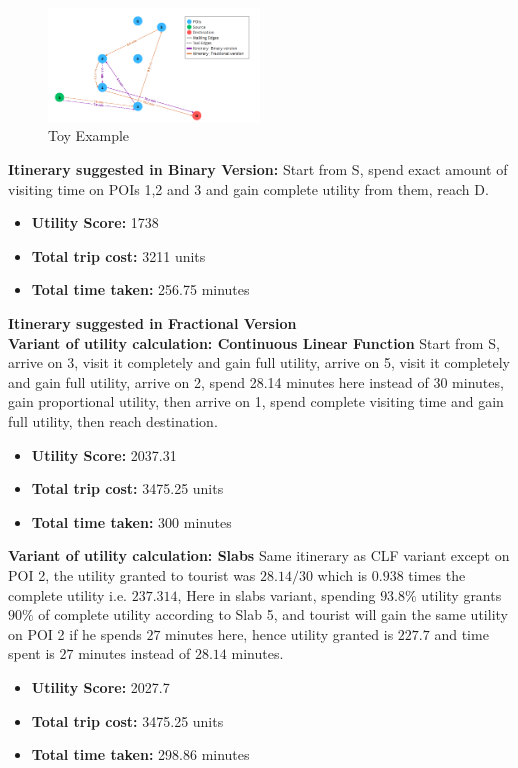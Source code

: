 \begin{figure}[H]
\centering
\includegraphics[width=0.5\textwidth]{toy.png}
\caption{Toy Example}
\label{fig:sample_image}
\end{figure}

\noindent \textbf{Itinerary suggested in Binary Version:}
Start from S, spend exact amount of visiting time on POIs 1,2 and 3 and gain complete utility from them, reach D.
\begin{itemize}
    \item \textbf{Utility Score:} 1738
    \item \textbf{Total trip cost:} 3211 units
    \item \textbf{Total time taken:} 256.75 minutes
\end{itemize}

\noindent \textbf{Itinerary suggested in Fractional Version}\\
\textbf{Variant of utility calculation: Continuous Linear Function}
Start from S, arrive on 3, visit it completely and gain full utility, arrive on 5, visit it completely and gain full utility, arrive on 2, spend 28.14 minutes here instead of 30 minutes, gain proportional utility, then arrive on 1, spend complete visiting time and gain full utility, then reach destination.
\begin{itemize}
    \item \textbf{Utility Score:} 2037.31
    \item \textbf{Total trip cost:} 3475.25 units
    \item \textbf{Total time taken:} 300 minutes
\end{itemize}

\noindent \textbf{Variant of utility calculation: Slabs}
Same itinerary as CLF variant except on POI 2, the utility granted to tourist was $28.14/30$
which is $0.938$ times the complete utility i.e. $237.314$, Here in slabs variant, spending $93.8\%$ utility grants $90\%$ of complete utility according to Slab 5, and tourist will gain the same utility on POI 2 if he spends $27$ minutes here, hence utility granted is $227.7$ and time spent is $27$ minutes instead of $28.14$ minutes.
\begin{itemize}
    \item \textbf{Utility Score:} 2027.7
    \item \textbf{Total trip cost:} 3475.25 units
    \item \textbf{Total time taken:} 298.86 minutes
\end{itemize}

